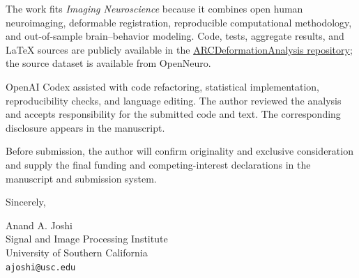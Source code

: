 \documentclass[10pt]{article}
\begin{document}
The work fits \emph{Imaging Neuroscience} because it combines open human
neuroimaging, deformable registration, reproducible computational methodology,
and out-of-sample brain--behavior modeling. Code, tests, aggregate results, and
LaTeX sources are publicly available in the
\href{https://github.com/ajoshiusc/ARCDeformationAnalysis}{ARCDeformationAnalysis
repository}; the source dataset is available from OpenNeuro.

OpenAI Codex assisted with code refactoring, statistical implementation,
reproducibility checks, and language editing. The author reviewed the analysis
and accepts responsibility for the submitted code and text. The corresponding
disclosure appears in the manuscript.

Before submission, the author will confirm originality and exclusive
consideration and supply the final funding and competing-interest declarations
in the manuscript and submission system.

Sincerely,

\vspace{0.5em}
Anand A. Joshi\\
Signal and Image Processing Institute\\
University of Southern California\\
\texttt{ajoshi@usc.edu}
\end{document}
